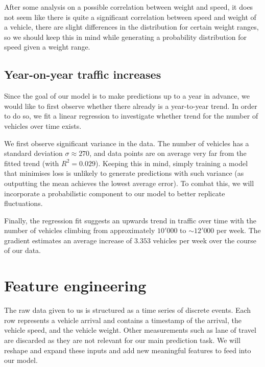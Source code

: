 \documentclass[10pt,conference,compsocconf]{IEEEtran}
\begin{document}
After some analysis on a possible correlation between weight and speed, it does not seem like there is quite a significant correlation between speed and weight of a vehicle, there are slight differences in the distribution for certain weight ranges, so we should keep this in mind while generating a probability distribution for speed given a weight range.

\subsection{Year-on-year traffic increases}

Since the goal of our model is to make predictions up to a year in advance, we would like to first observe whether there already is a year-to-year trend. In order to do so, we fit a linear regression to investigate whether trend for the number of vehicles over time exists. 

We first observe significant variance in the data. The number of vehicles has a standard deviation $\sigma \approx 270$, and data points are on average very far from the fitted trend (with $R^2 = 0.029$). Keeping this in mind, simply training a model that minimises loss is unlikely to generate predictions with such variance (as outputting the mean achieves the lowest average error). To combat this, we will incorporate a probabilistic component to our model to better replicate fluctuations. 

Finally, the regression fit suggests an upwards trend in traffic over time with the number of vehicles climbing from approximately $10'000$ to $\sim 12'000$ per week. The gradient estimates an average increase of $3.353$ vehicles per week over the course of our data. 


\section{Feature engineering}

The raw data given to us is structured as a time series of discrete events. Each row represents 
a vehicle arrival and contains a timestamp of the arrival, the vehicle speed, and the vehicle 
weight. Other measurements such as lane of travel are discarded as they are not relevant for 
our main prediction task. We will reshape and expand these inputs and add new meaningful 
features to feed into our model. 
\end{document}

